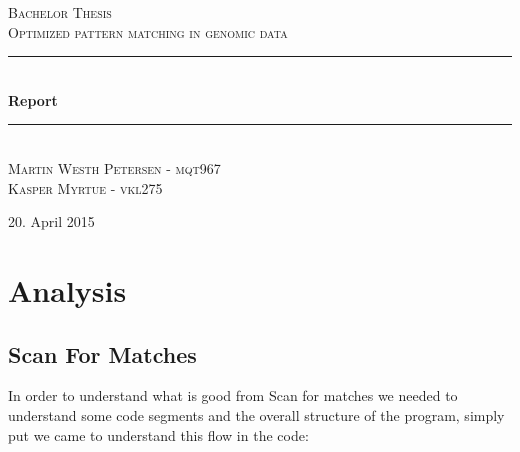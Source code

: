 \documentclass[12pt]{article}
\newcommand{\HRule}{\rule{\linewidth}{0.5mm}}
\begin{document}
\begin{titlepage}
\begin{center}

\textsc{\Large Bachelor Thesis \\ Optimized pattern matching in genomic data\\[0.3cm]}
\HRule \\[0.4cm]
{ \LARGE \bfseries Report}\\[0.4cm]
\HRule \\[1.2cm]
\textsc{\large Martin Westh Petersen - mqt967 \\ Kasper Myrtue - vkl275}\\[1.0cm]
\end{center}
\begin{center}
\vfill
{\large 20. April 2015}
\end{center}
\end{titlepage}
\tableofcontents

\section{Analysis}
\subsection{Scan For Matches}
In order to understand what is good from Scan for matches we needed to understand some code segments and the overall structure of the program, simply put we came to understand this flow in the code:
\end{document}

